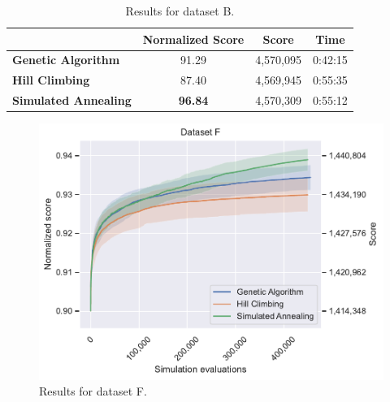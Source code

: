 \begin{table}[h]
\centering\footnotesize\sf
\begin{tabular}{lccc}
\toprule
& Normalized Score & Score & Time \\
\midrule
\textcolor{myblue}{\textbf{Genetic Algorithm}} & 91.29 & 4,570,095 & 0:42:15 \\
\textcolor{myorange}{\textbf{Hill Climbing}} & 87.40 & 4,569,945 & 0:55:35 \\
\textcolor{mygreen}{\textbf{Simulated Annealing}} & \textbf{96.84} & 4,570,309 & 0:55:12 \\
\bottomrule
\end{tabular}
\caption[Results for dataset B]{Results for dataset B.}
\label{tab:dataset_b_results}
\end{table}

\newpage

\begin{figure}[h]
    \centering
    \includegraphics[width=\linewidth]{img/experiments/f_Genetic Algorithm_Hill Climbing_Simulated Annealing.pdf}
    \caption[Results for dataset F]{
        Results for dataset F.
    }
    \label{fig:dataset_f_experiment}
\end{figure}

